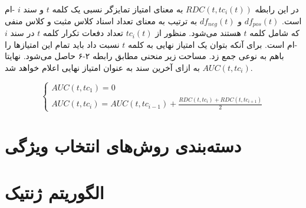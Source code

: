در این رابطه
$RDC(t, tc_i(t))$
به معنای امتیاز تمایزگر نسبی یک کلمه
$t$
و سند
$i$
-ام است.
$df_{pos}(t)$
و
$df_{neg}(t)$
به ترتیب به معنای تعداد اسناد کلاس مثبت و کلاس منفی که شامل کلمه
$t$
هستند می‌شود. منظور از
$tc_i(t)$
تعداد دفعات تکرار کلمه
$t$
در سند
$i$
-ام است. برای آنکه بتوان یک امتیاز نهایی به کلمه
$t$
نسبت داد باید تمام این امتیازها را باهم به نوعی جمع زد. مساحت زیر منحنی مطابق رابطه ۲-۶ حاصل می‌شود. نهایتا
$AUC(t,tc_i)$
به ازای آخرین سند به عنوان امتیاز نهایی اعلام خواهد شد.

\begin{equation}
\begin{cases}
AUC(t,tc_1) = 0 \\
AUC(t,tc_i) = AUC(t,tc_{i-1}) + \frac{RDC(t,tc_i)+RDC(t,tc_{i+1})}{2}
\end{cases}
\end{equation}

\section{دسته‌بندی روش‌های انتخاب ویژگی}
\section{الگوریتم ژنتیک}
